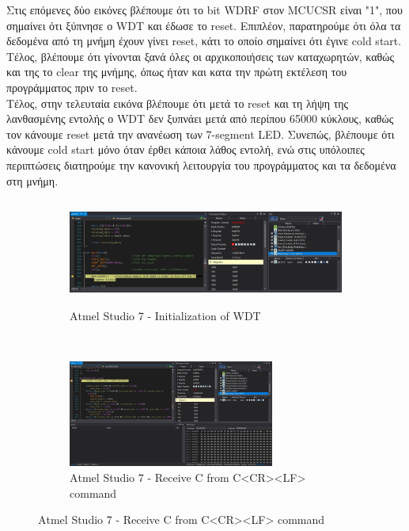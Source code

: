 \documentclass{article}
\begin{document}
	\noindent
	Στις επόμενες δύο εικόνες βλέπουμε ότι το bit WDRF στον MCUCSR είναι "1", που σημαίνει ότι ξύπνησε ο WDT και έδωσε το reset. Επιπλέον, παρατηρούμε ότι όλα τα δεδομένα από τη μνήμη έχουν γίνει reset, κάτι το οποίο σημαίνει ότι έγινε cold start. Tέλος, βλέπουμε ότι γίνονται ξανά όλες οι αρχικοποιήσεις των καταχωρητών, καθώς και της το clear της μνήμης, όπως ήταν και κατα την πρώτη εκτέλεση του προγράμματος πριν το reset.\\
	
	\noindent
	Τέλος, στην τελευταία εικόνα βλέπουμε ότι μετά το reset και τη λήψη της λανθασμένης εντολής ο WDT δεν ξυπνάει μετά από περίπου 65000 κύκλους, καθώς τον κάνουμε reset μετά την ανανέωση των 7-segment LED. Συνεπώς, βλέπουμε ότι κάνουμε cold start μόνο όταν έρθει κάποια λάθος εντολή, ενώ στις υπόλοιπες περιπτώσεις διατηρούμε την κανονική λειτουργία του προγράμματος και τα δεδομένα στη μνήμη.
	
	\begin{figure}[h!]
		\centering
		\begin{subfigure}[t]{0.5\textwidth}
			\centering
			\includegraphics[height=3.5cm, width=\linewidth]{./results/lab6_sim_wdt_init.jpg}
			\caption{Αtmel Studio 7 - Initialization of WDT}
		\end{subfigure}%
		~
		\begin{subfigure}[t]{0.5\textwidth}
			\centering
			\includegraphics[height=3.5cm, width=\linewidth]{./results/lab6_sim_usart_rxc.jpg}
			\caption{Αtmel Studio 7 - Receive C from C<CR><LF> command}
		\end{subfigure}
	\end{figure}
\end{document}

